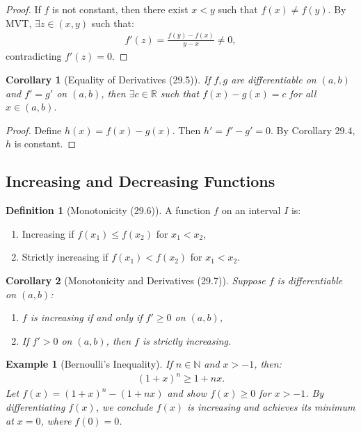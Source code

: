\documentclass[9pt]{article}
\theoremstyle{definition}
\newtheorem{definition}{Definition}
\theoremstyle{plain}
\newtheorem{example}{Example}
\newtheorem{corollary}{Corollary}
\begin{document}
\begin{proof}
If $ f $ is not constant, then there exist $ x < y $ such that $ f(x) \neq f(y) $. By MVT, $ \exists z \in (x, y) $ such that:
\begin{align}
f'(z) = \frac{f(y) - f(x)}{y - x} \neq 0,
\end{align}
contradicting $ f'(z) = 0 $.
\end{proof}

\begin{corollary}[Equality of Derivatives (29.5)]
If $ f, g $ are differentiable on $ (a, b) $ and $ f' = g' $ on $ (a, b) $, then $ \exists c \in \mathbb{R} $ such that $ f(x) - g(x) = c $ for all $ x \in (a, b) $.
\end{corollary}

\begin{proof}
Define $ h(x) = f(x) - g(x) $. Then $ h' = f' - g' = 0 $. By Corollary 29.4, $ h $ is constant.
\end{proof}

\subsection*{Increasing and Decreasing Functions}
\begin{definition}[Monotonicity (29.6)]
A function $ f $ on an interval $ I $ is:
\begin{enumerate}
    \item {Increasing} if $ f(x_1) \leq f(x_2) $ for $ x_1 < x_2 $,
    \item {Strictly increasing} if $ f(x_1) < f(x_2) $ for $ x_1 < x_2 $.
\end{enumerate}
\end{definition}

\begin{corollary}[Monotonicity and Derivatives (29.7)]
Suppose $ f $ is differentiable on $ (a, b) $:
\begin{enumerate}
    \item $ f $ is increasing if and only if $ f' \geq 0 $ on $ (a, b) $,
    \item If $ f' > 0 $ on $ (a, b) $, then $ f $ is strictly increasing.
\end{enumerate}
\end{corollary}

\begin{example}[Bernoulli’s Inequality]
If $ n \in \mathbb{N} $ and $ x > -1 $, then:
\begin{align}
(1 + x)^n \geq 1 + nx.
\end{align}
Let $ f(x) = (1 + x)^n - (1 + nx) $ and show $ f(x) \geq 0 $ for $ x > -1 $. By differentiating $ f(x) $, we conclude $ f(x) $ is increasing and achieves its minimum at $ x = 0 $, where $ f(0) = 0 $.
\end{example}
\end{document}
